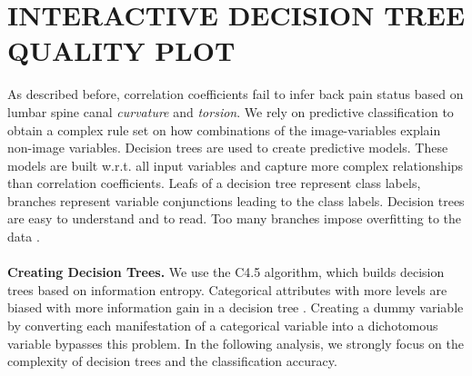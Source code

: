 \documentclass[a4paper,twoside]{style/article}
\begin{document}
\section{\uppercase{Interactive Decision Tree Quality Plot}}
\label{sec:DecisionTrees}
\noindent As described before, correlation coefficients fail to infer back pain status based on lumbar spine canal \emph{curvature} and \emph{torsion}.
We rely on predictive classification to obtain a complex rule set on how combinations of the image-variables explain non-image variables.
Decision trees are used to create predictive models.
These models are built w.r.t. all input variables and capture more complex relationships than correlation coefficients.
Leafs of a decision tree represent class labels, branches represent variable conjunctions leading to the class labels.
Decision trees are easy to understand and to read.
Too many branches impose overfitting to the data \cite{DecisionTree}.
\\\\
\noindent \textbf{Creating Decision Trees.}
We use the C4.5 algorithm, which builds decision trees based on information entropy.
Categorical attributes with more levels are biased with more information gain in a decision tree \cite{deng2011bias}.
Creating a dummy variable by converting each manifestation of a categorical variable into a dichotomous variable bypasses this problem.
In the following analysis, we strongly focus on the complexity of decision trees and the classification accuracy.
\end{document}
